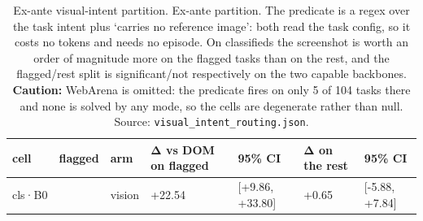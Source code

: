 \begin{table}[tp]
\centering
\caption{Ex-ante visual-intent partition. Ex-ante partition. The predicate is a regex over the task intent plus `carries no reference image': both read the task config, so it costs no tokens and needs no episode. On classifieds the screenshot is worth an order of magnitude more on the flagged tasks than on the rest, and the flagged/rest split is significant/not respectively on the two capable backbones. \textbf{Caution:} WebArena is omitted: the predicate fires on only 5 of 104 tasks there and none is solved by any mode, so the cells are degenerate rather than null. Source: \texttt{visual\_intent\_routing.json}.}
\label{tab:t17}
\footnotesize
\setlength{\tabcolsep}{3pt}
\begin{tabular}{@{}
  >{\raggedright\arraybackslash}p{}
  >{\raggedright\arraybackslash}p{}
  >{\raggedright\arraybackslash}p{}
  >{\raggedright\arraybackslash}p{}
  >{\raggedright\arraybackslash}p{}
  >{\raggedright\arraybackslash}p{}
  >{\raggedright\arraybackslash}p{}@{}}
\toprule
\begin{minipage}[b]{\linewidth}\raggedright
cell
\end{minipage} & \begin{minipage}[b]{\linewidth}\raggedright
flagged
\end{minipage} & \begin{minipage}[b]{\linewidth}\raggedright
arm
\end{minipage} & \begin{minipage}[b]{\linewidth}\raggedright
Δ vs DOM on flagged
\end{minipage} & \begin{minipage}[b]{\linewidth}\raggedright
95\% CI
\end{minipage} & \begin{minipage}[b]{\linewidth}\raggedright
Δ on the rest
\end{minipage} & \begin{minipage}[b]{\linewidth}\raggedright
95\% CI
\end{minipage} \\
\midrule
cls·B0 & 71 & vision & +22.54 & {[}+9.86, +33.80{]} & +0.65 & {[}-5.88, +7.84{]} \\

\end{tabular}
\end{table}

